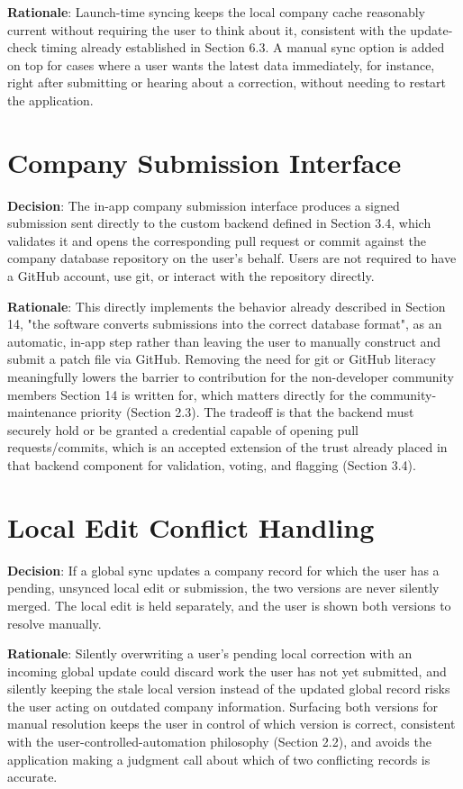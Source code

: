 \textbf{Rationale}: Launch-time syncing keeps the local company cache reasonably current without requiring the user to think about it, consistent with the update-check timing already established in Section 6.3. A manual sync option is added on top for cases where a user wants the latest data immediately, for instance, right after submitting or hearing about a correction, without needing to restart the application.
\section{Company Submission Interface}
\textbf{Decision}: The in-app company submission interface produces a signed submission sent directly to the custom backend defined in Section 3.4, which validates it and opens the corresponding pull request or commit against the company database repository on the user's behalf. Users are not required to have a GitHub account, use git, or interact with the repository directly.

\textbf{Rationale}: This directly implements the behavior already described in Section 14, "the software converts submissions into the correct database format", as an automatic, in-app step rather than leaving the user to manually construct and submit a patch file via GitHub. Removing the need for git or GitHub literacy meaningfully lowers the barrier to contribution for the non-developer community members Section 14 is written for, which matters directly for the community-maintenance priority (Section 2.3). The tradeoff is that the backend must securely hold or be granted a credential capable of opening pull requests/commits, which is an accepted extension of the trust already placed in that backend component for validation, voting, and flagging (Section 3.4).
\section{Local Edit Conflict Handling}
\textbf{Decision}: If a global sync updates a company record for which the user has a pending, unsynced local edit or submission, the two versions are never silently merged. The local edit is held separately, and the user is shown both versions to resolve manually.

\textbf{Rationale}: Silently overwriting a user's pending local correction with an incoming global update could discard work the user has not yet submitted, and silently keeping the stale local version instead of the updated global record risks the user acting on outdated company information. Surfacing both versions for manual resolution keeps the user in control of which version is correct, consistent with the user-controlled-automation philosophy (Section 2.2), and avoids the application making a judgment call about which of two conflicting records is accurate.

\sentinelchapterend